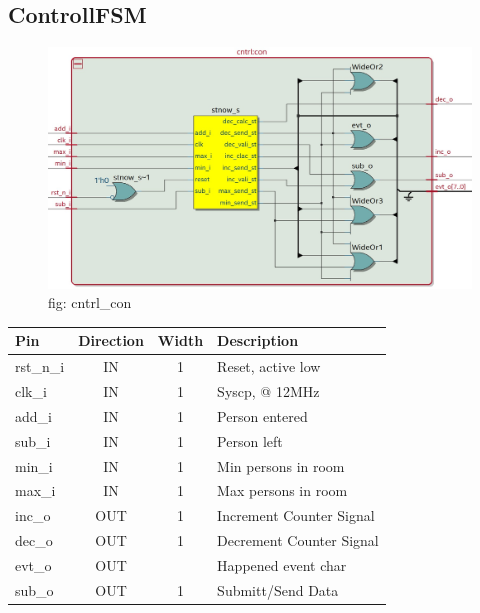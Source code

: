 \documentclass[12pt,a4 paper] {report}
\begin{document}
\subsection{ControllFSM}
\begin{figure}[h]
	\centering	
	\includegraphics[scale=0.3]{../png/cntrl_con.png}
	\newline
	fig: cntrl\_con \\
\end{figure}
\begin{center}
	\begin{tabular}{ | p{2cm} | c | c | p{5cm} |}
		\hline
		\textbf{Pin} & \textbf{Direction} & \textbf{Width} & \textbf{Description} \\
		\hline	
		rst\_n\_i & IN & 1 & Reset, active low \\
		\hline
		clk\_i & IN & 1 & Syscp, @ 12MHz \\
		\hline
		add\_i & IN & 1 & Person entered \\
		\hline
		sub\_i & IN & 1 & Person left \\
		\hline
		min\_i & IN & 1 & Min persons in room \\
		\hline
		max\_i & IN & 1 & Max persons in room \\
		\hline
		inc\_o & OUT & 1 & Increment Counter Signal \\
		\hline
		dec\_o & OUT & 1 & Decrement Counter Signal \\
		\hline
		evt\_o & OUT &  & Happened event char \\
		\hline
		sub\_o & OUT & 1 & Submitt/Send Data \\
		\hline
	\end{tabular}
\end{center}

\newpage
\end{document}
